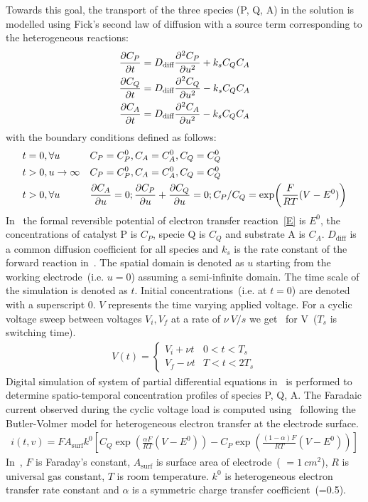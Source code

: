 Towards this goal, the transport of the three species (P, Q, A) in the solution is modelled using Fick's second law of diffusion with a source term corresponding to the heterogeneous reactions:
\begin{align}
    \pdv{C_P}{t} &= D_{\text{diff}}\pdv[2]{C_P}{u} + k_{s}C_{Q}C_{A} \nonumber\\
    \pdv{C_Q}{t} &= D_{\text{diff}}\pdv[2]{C_Q}{u} - k_{s}C_{Q}C_{A} \nonumber\\
    \pdv{C_A}{t} &= D_{\text{diff}}\pdv[2]{C_A}{u} - k_{s}C_{Q}C_{A} \label{eq:fickslaws}
\end{align}
with the boundary conditions defined as follows:
\begin{align}
    t&=0, \forall u &  &C_P = C^0_{P}, C_A = C^0_{A}, C_Q = C^0_{Q} \nonumber \\
    t&>0, u\rightarrow \infty &  &C_P = C^0_{P}, C_A = C^0_{A}, C_Q = C^0_{Q}  \nonumber\\
    t&>0, \forall u &  &\pdv{C_A}{u}=0; \pdv{C_P}{u}+\pdv{C_Q}{u}=0; C_P/C_Q = \exp(\frac{F}{RT}(V-E^0)) \label{eq:bcs}
\end{align}
In~ the formal reversible potential of electron transfer reaction~\cref{E} is \(E^0\), the concentrations of catalyst P is \(C_P\), specie Q is \(C_Q\) and substrate A is \(C_A\). \(D_{\text{diff}}\) is a common diffusion coefficient for all species and \(k_{s}\) is the rate constant of the forward reaction in~. 
The spatial domain is denoted as \(u\) starting from the working electrode~(i.e. \(u=0\)) assuming a semi-infinite domain. The time scale of the simulation is denoted as \(t\). Initial concentrations~(i.e. at \(t=0\)) are denoted with a superscript 0. \(V\) represents the time varying applied voltage. 
For a cyclic voltage sweep between voltages \(V_i, V_f\) at a rate of \(\nu~V/s\) we get~ for V~(\(T_s\) is switching time).
\begin{align}\label{eq:voltage_scan}
    V(t) = 
    \begin{cases}
        V_i + \nu t & 0<t<T_s\\
        V_f - \nu t & T<t<2T_s
    \end{cases}
\end{align}
Digital simulation of system of partial differential equations in~ is performed to determine spatio-temporal concentration profiles of species P, Q, A. 
The Faradaic current observed during the cyclic voltage load is computed using~ following the Butler-Volmer model for heterogeneous electron transfer at the electrode surface.
\begin{align}\label{eq:current}
    i(t,v) = FA_{\text{surf}}k^0\left[C_Q\exp(\frac{\alpha F}{RT}(V-E^0)) - C_P\exp(\frac{(1-\alpha)F}{RT}(V-E^0))\right]
\end{align}
In~, \(F\) is Faraday's constant, \(A_{\text{surf}}\) is surface area of electrode~( \(=1~cm^2\)), \(R\) is universal gas constant, \(T\) is room temperature.
\(k^0\) is heterogeneous electron transfer rate constant and \(\alpha\) is a symmetric charge transfer coefficient~(=0.5).
    
